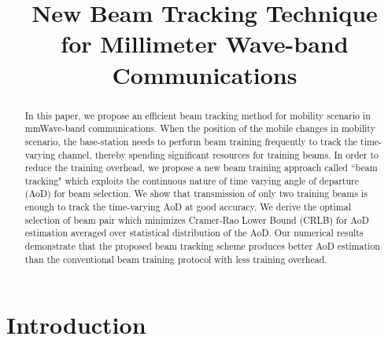 \documentclass[conference]{IEEEtran}
\begin{document}
\title{New Beam Tracking Technique \\ for Millimeter Wave-band Communications}



\author{
}

\maketitle

\begin{abstract}
In this paper, we propose an efficient beam tracking method for mobility scenario in mmWave-band communications. When the position of the mobile changes in mobility scenario, the base-station needs to perform beam training frequently to track the time-varying channel, thereby spending significant resources for training beams.   In order to reduce the training overhead,  we propose a new beam training approach called ``beam tracking"  which exploits the continuous nature of time varying angle of departure (AoD) for beam selection. We show that transmission of only two training beams is enough to track the time-varying AoD at good accuracy. We derive the optimal selection of beam pair which minimizes Cramer-Rao Lower Bound (CRLB) for AoD estimation  averaged over statistical distribution of  the AoD.  Our numerical results demonstrate that the proposed beam tracking scheme produces better AoD estimation than the conventional beam training protocol with less training overhead.
\end{abstract}


%
\IEEEpeerreviewmaketitle

\section{Introduction}
\end{document}

